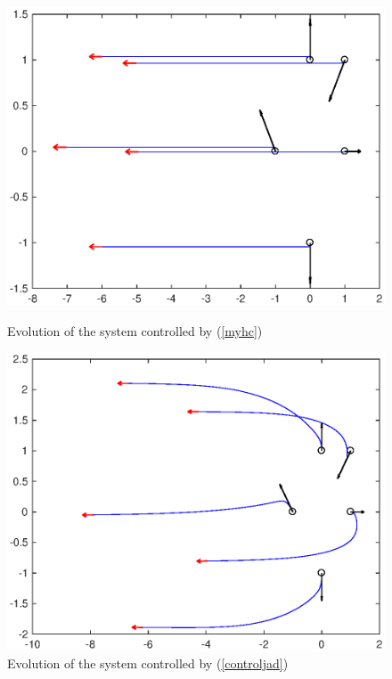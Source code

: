 \documentclass[a4paper,10pt, english]{article}
\begin{document}
  \begin{figure}[ht]
    \begin{minipage}[b]{0.5\textwidth}
      \includegraphics[width=\textwidth]{figures/my_h_ev.eps}
      \caption{Evolution of the system controlled by (\ref{myhc})}
      \label{my_h_ev}
    \end{minipage}
    \hfill
    \begin{minipage}[b]{0.5\textwidth}
      \includegraphics[width=\textwidth]{figures/jad_h_ev.eps}
      \caption{Evolution of the system controlled by (\ref{controljad})}
      \label{jad_h_ev}
    \end{minipage}
  \end{figure}
  
\end{document}
